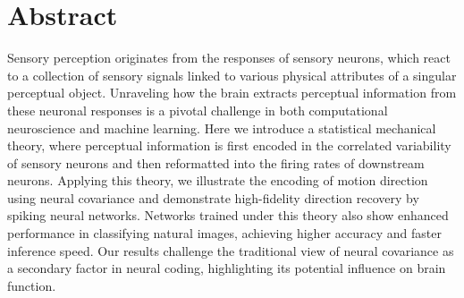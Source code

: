 \section*{Abstract}
Sensory perception originates from the responses of sensory neurons, which react to a collection of sensory signals linked to various physical attributes of a singular perceptual object. 
Unraveling how the brain extracts perceptual information from these neuronal responses is a pivotal challenge in both computational neuroscience and machine learning.
Here we introduce a statistical mechanical theory, where perceptual information is first encoded in the correlated variability of sensory neurons and then reformatted into the firing rates of downstream neurons.
Applying this theory, we illustrate the encoding of motion direction using neural covariance and demonstrate high-fidelity direction recovery by spiking neural networks.
Networks trained under this theory also show enhanced performance in classifying natural images, achieving higher accuracy and faster inference speed. 
Our results challenge the traditional view of neural covariance as a secondary factor in neural coding, highlighting its potential influence on brain function.
